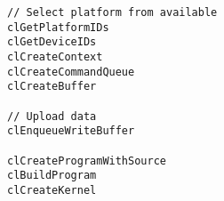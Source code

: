\lstset{language=C++}
\begin{lstlisting}
// Select platform from available
clGetPlatformIDs
clGetDeviceIDs
clCreateContext
clCreateCommandQueue
clCreateBuffer

// Upload data
clEnqueueWriteBuffer

clCreateProgramWithSource
clBuildProgram
clCreateKernel
\end{lstlisting}